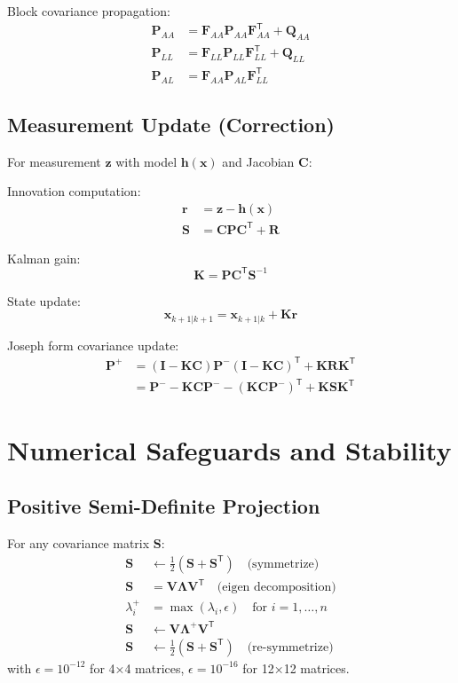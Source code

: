 \documentclass{article}
\newcommand{\vect}[1]{\bm{#1}}
\newcommand{\T}{\mathsf{T}}
\begin{document}
Block covariance propagation:
\begin{align}
\vect{P}_{AA} &= \vect{F}_{AA} \vect{P}_{AA} \vect{F}_{AA}^\T + \vect{Q}_{AA} \\
\vect{P}_{LL} &= \vect{F}_{LL} \vect{P}_{LL} \vect{F}_{LL}^\T + \vect{Q}_{LL} \\
\vect{P}_{AL} &= \vect{F}_{AA} \vect{P}_{AL} \vect{F}_{LL}^\T
\end{align}

\subsection{Measurement Update (Correction)}

For measurement $\vect{z}$ with model $\vect{h}(\vect{x})$ and Jacobian $\vect{C}$:

Innovation computation:
\begin{align}
\vect{r} &= \vect{z} - \vect{h}(\vect{x}) \\
\vect{S} &= \vect{C} \vect{P} \vect{C}^\T + \vect{R}
\end{align}

Kalman gain:
\begin{equation}
\vect{K} = \vect{P} \vect{C}^\T \vect{S}^{-1}
\end{equation}

State update:
\begin{equation}
\vect{x}_{k+1|k+1} = \vect{x}_{k+1|k} + \vect{K} \vect{r}
\end{equation}

Joseph form covariance update:
\begin{align}
\vect{P}^+ &= (\vect{I} - \vect{K} \vect{C}) \vect{P}^- (\vect{I} - \vect{K} \vect{C})^\T + \vect{K} \vect{R} \vect{K}^\T \\
&= \vect{P}^- - \vect{K}\vect{C}\vect{P}^- - (\vect{K}\vect{C}\vect{P}^-)^\T + \vect{K}\vect{S}\vect{K}^\T
\end{align}

\section{Numerical Safeguards and Stability}

\subsection{Positive Semi-Definite Projection}

For any covariance matrix $\vect{S}$:
\begin{align}
\vect{S} &\leftarrow \frac{1}{2}(\vect{S} + \vect{S}^\T) \quad \text{(symmetrize)} \\
\vect{S} &= \vect{V} \vect{\Lambda} \vect{V}^\T \quad \text{(eigen decomposition)} \\
\lambda_i^+ &= \max(\lambda_i, \epsilon) \quad \text{for } i=1,\dots,n \\
\vect{S} &\leftarrow \vect{V} \vect{\Lambda}^+ \vect{V}^\T \\
\vect{S} &\leftarrow \frac{1}{2}(\vect{S} + \vect{S}^\T) \quad \text{(re-symmetrize)}
\end{align}
with $\epsilon = 10^{-12}$ for 4×4 matrices, $\epsilon = 10^{-16}$ for 12×12 matrices.
\end{document}
